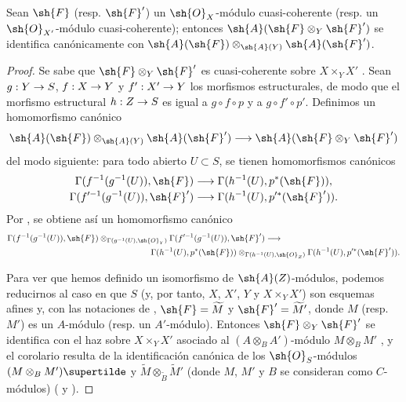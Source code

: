 \documentclass[oneside,10pt]{amsart}
\makeatletter
\newcommand{\ega@arrow}[2]{\mathchoice{#1}{#2}{#2}{#2}}
\renewcommand{\to}{\ega@arrow{\longrightarrow}{\rightarrow}}
\newcommand{\oldpage}[2][]{\marginnote{\normalfont\footnotesize\textbf{#1}~|~#2}\ignorespaces}
\let\EGAOriginalLabel\label
\renewcommand{\label}[1]{\phantomsection\EGAOriginalLabel{#1}}
\makeatother
\begin{document}
\begin{corollary}[1.4.7]
\label{II.1.4.7}
Sean $\sh{F}$ \textup{(resp. $\sh{F}'$)} un $\sh{O}_X$-módulo cuasi-coherente \textup{(resp.} un $\sh{O}_{X'}$-módulo cuasi-coherente); entonces $\sh{A}(\sh{F}\otimes_Y\sh{F}')$ se identifica canónicamente con $\sh{A}(\sh{F})\otimes_{\sh{A}(Y)}\sh{A}(\sh{F}')$.
\end{corollary}

\begin{proof}
Se sabe que $\sh{F}\otimes_Y\sh{F}'$ es cuasi-coherente sobre $X\times_Y X'$ .
Sean $g:Y\to S$, $f:X\to Y$ y $f':X'\to Y$ los morfismos estructurales, de modo que el morfismo estructural
\oldpage[II]{11}
$h:Z\to S$ es igual a $g\circ f\circ p$ y a $g\circ f'\circ p'$.
Definimos un homomorfismo canónico
\[
  \sh{A}(\sh{F})\otimes_{\sh{A}(Y)}\sh{A}(\sh{F}')
  \longrightarrow
  \sh{A}(\sh{F}\otimes_Y\sh{F}')
\]
del modo siguiente: para todo abierto $U\subset S$, se tienen homomorfismos canónicos
\[
  \begin{aligned}
  \Gamma(f^{-1}(g^{-1}(U)),\sh{F})
  &\longrightarrow\Gamma(h^{-1}(U),p^*(\sh{F})),
  \\[-2pt]
  \Gamma(f^{\prime-1}(g^{-1}(U)),\sh{F}')
  &\longrightarrow\Gamma(h^{-1}(U),p^{\prime*}(\sh{F}')).
  \end{aligned}
\]
Por , se obtiene así un homomorfismo canónico
\[
  \begin{aligned}
  &\Gamma(f^{-1}(g^{-1}(U)),\sh{F})
    \otimes_{\Gamma(g^{-1}(U),\sh{O}_Y)}
    \Gamma(f^{\prime-1}(g^{-1}(U)),\sh{F}')
    \longrightarrow\\
  &\hspace{17em}
    \Gamma(h^{-1}(U),p^*(\sh{F}))
    \otimes_{\Gamma(h^{-1}(U),\sh{O}_Z)}
    \Gamma(h^{-1}(U),p^{\prime*}(\sh{F}')).
  \end{aligned}
\]

Para ver que hemos definido un isomorfismo de $\sh{A}(Z)$-módulos, podemos reducirnos al caso en que $S$ (y, por tanto, $X$, $X'$, $Y$ y $X\times_Y X'$) son esquemas afines y, con las notaciones de , $\sh{F}=\widetilde{M}$ y $\sh{F}'=\widetilde M'$, donde $M$ (resp. $M'$) es un $A$-módulo (resp. un $A'$-módulo).
Entonces $\sh{F}\otimes_Y\sh{F}'$ se identifica con el haz sobre $X\times_Y X'$ asociado al $(A\otimes_B A')$-módulo $M\otimes_B M'$ , y el corolario resulta de la identificación canónica de los $\sh{O}_S$-módulos $(M\otimes_B M')\supertilde$ y $\widetilde{M}\otimes_{\widetilde{B}}\widetilde M'$ (donde $M$, $M'$ y $B$ se consideran como $C$-módulos) ( y ).
\end{proof}
\end{document}
